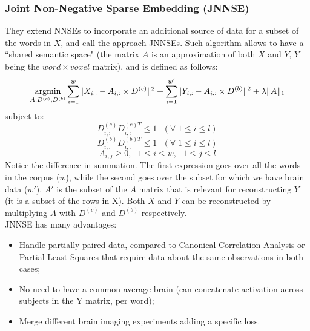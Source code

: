 \subsubsection{Joint Non-Negative Sparse Embedding (JNNSE)}
They extend NNSEs to incorporate an additional source of data for a subset of the words in $X$, and call the approach JNNSEs.
Such algorithm allows to have a ``shared semantic space" (the matrix $A$ is an approximation of both $X$ and $Y$, $Y$ being the $word \times voxel$ matrix), and is defined as follows:
\[
\operatorname*{argmin}_{A,D^{(c)},D^{(b)}} \sum_{i=1}^w \lVert X_{i,:} - A_{i,:} \times D^{(c)} \rVert^2 +  \sum_{i=1}^{w'} \lVert Y_{i,:} - A_{i,:} \times D^{(b)} \rVert^2 + \lambda \lVert A\rVert_1
\]
subject to:
\[
D_{i,:}^{(c)}D_{i,:}^{(c)T} \leq 1 \:\:\:(\forall \;1 \leq i \leq l)
\]
\[
D_{i,:}^{(b)}D_{i,:}^{(b)T} \leq 1 \:\:\:(\forall \;1 \leq i \leq l)
\]
\[
A_{i,j} \geq 0,\:\:\: 1 \leq i \leq w,\:\:\: 1 \leq j \leq l
\]
Notice the difference in summation. The first expression goes over all the words in the corpus ($w$), while the second goes over the subset for which we have brain data ($w'$).
$A'$ is the subset of the $A$ matrix that is relevant for reconstructing $Y$ (it is a subset of the rows in X).
Both $X$ and $Y$ can be reconstructed by multiplying $A$ with $D^{(c)}$ and $D^{(b)}$ respectively.\\

JNNSE has many advantages:
\begin{itemize}
    \item Handle partially paired data, compared to Canonical Correlation Analysis or Partial Least Squares that require data about the same observations in both cases;
    \item No need to have a common average brain (can concatenate activation across subjects in the Y matrix, per word);
    \item Merge different brain imaging experiments adding a specific loss.
\end{itemize}

